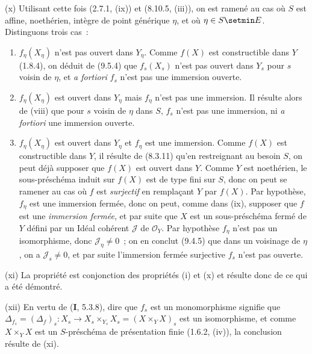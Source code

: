 (x) Utilisant cette fois (2.7.1, (ix)) et (8.10.5, (iii)), on est ramené au cas
où $S$ est affine, noethérien, intègre de point générique $\eta$, et où
$\eta\in S\setmin E$. Distinguons trois cas~:

\begin{enumerate}[label=\upshape{$\arabic{enumi}^\circ$}]
  \item $f_\eta(X_\eta)$ n'est pas ouvert dans $Y_\eta$. Comme $f(X)$ est
  constructible dans $Y$ (1.8.4), on déduit de (9.5.4) que $f_s(X_s)$ n'est
  pas ouvert dans $Y_s$ pour $s$ voisin de $\eta$, et \emph{a fortiori} $f_s$
  n'est pas une immersion ouverte.

  \item $f_\eta(X_\eta)$ est ouvert dans $Y_\eta$ mais $f_\eta$ n'est pas une
  immersion. Il résulte alors de (viii) que pour $s$ voisin de $\eta$ dans $S$,
  $f_s$ n'est pas une immersion, ni \emph{a fortiori} une immersion ouverte.

  \item $f_\eta(X_\eta)$ est ouvert dans $Y_\eta$ et $f_\eta$ est une
  immersion. Comme $f(X)$ est constructible dans $Y$, il résulte de (8.3.11)
  qu'en restreignant au besoin $S$, on peut déjà supposer que $f(X)$ est ouvert
  dans $Y$. Comme $Y$ est noethérien, le sous-préschéma induit sur $f(X)$ est
  de type fini sur $S$, donc on peut se ramener au cas où $f$ est \emph{surjectif}
  en remplaçant $Y$ par $f(X)$. Par hypothèse, $f_\eta$ est une immersion
  fermée, donc on peut, comme dans (ix), supposer que $f$ est une \emph{immersion
  fermée}, et par suite que $X$ est un sous-préschéma fermé de $Y$ défini
  par un Idéal cohérent $\mathcal J$ de $\mathcal O_Y$. Par hypothèse
  $f_\eta$ n'est pas un isomorphisme, donc $\mathcal J_\eta\neq0$~; on en
  conclut (9.4.5) que dans un voisinage de $\eta$, on a $\mathcal J_s\neq0$,
  et par suite l'immersion fermée surjective $f_s$ n'est pas ouverte.
\end{enumerate}

(xi) La propriété est conjonction des propriétés (i) et (x) et résulte donc de
ce qui a été démontré.

(xii) En vertu de (\textbf{I}, 5.3.8), dire que $f_s$ est un monomorphisme
signifie que
$\Delta_{f_s}=(\Delta_f)_s:X_s\to X_s\times_{Y_s}X_s=(X\times_YX)_s$ est un
isomorphisme, et comme $X\times_YX$ est un $S$-préschéma de présentation finie
(1.6.2, (iv)), la conclusion résulte de (xi).

